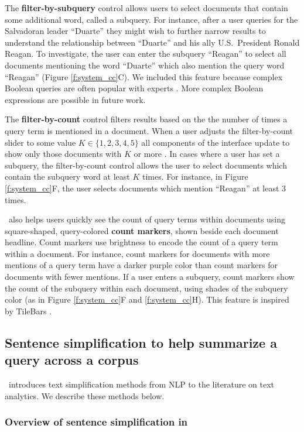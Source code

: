 The \textbf{filter-by-subquery} control allows users to select documents that contain some additional word, called a subquery. For instance, after a user queries for the Salvadoran leader ``{Duarte}'' they might wish to further narrow results to understand the relationship between ``{Duarte}'' and his ally U.S.\ President Ronald Reagan.
To investigate, the user can enter the subquery ``{Reagan}'' to select all documents mentioning the word ``{Duarte}'' which also mention the query word ``{Reagan}'' (Figure \ref{f:system_cc}C).
We included this feature because complex Boolean queries are often popular with experts \cite[Section 1.4]{irbook}.
More complex Boolean expressions are possible in future work.

The \textbf{filter-by-count} control filters results based on the the number of times a query term is mentioned in a document.
When a user adjusts the filter-by-count slider to some value $K \in \{1,2,3,4,5\}$ all components of the interface update to show only those documents with $K$ or more \specificmention.
In cases where a user has set a subquery, the filter-by-count control allows the user to select documents which contain the subquery word at least $K$ times.
For instance, in Figure \ref{f:system_cc}F, the user selects documents which mention ``{Reagan}'' at least 3 times.

\ours~also helps users quickly see the count of query terms within documents using square-shaped, query-colored \textbf{count markers}, shown beside each document headline.
Count markers use brightness to encode the count of a query term within a document.
For instance, count markers for documents with more mentions of a query term have a darker purple color than count markers for documents with fewer mentions.
If a user enters a subquery, count markers show the count of the subquery within each document, using shades of the subquery color (as in Figure \ref{f:system_cc}F and \ref{f:system_cc}H).
This feature is inspired by TileBars \cite{TileBars}.

\subsection{Sentence simplification to help summarize a query across a corpus}\label{s:simplification}

\ours~introduces text simplification methods from NLP to the literature on text analytics. We describe these methods below.

\subsubsection{Overview of sentence simplification in \ours}\label{s:text_simplification_overview}


